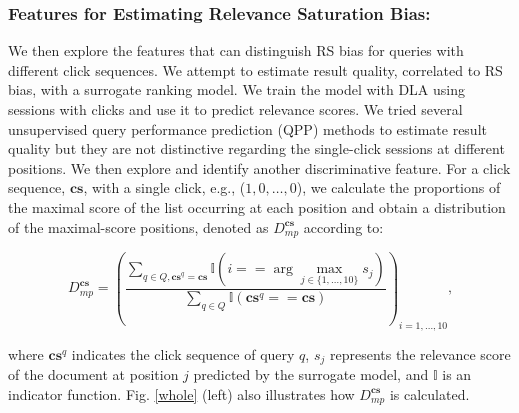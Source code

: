 \subsubsection{Features for Estimating Relevance Saturation Bias:} We then explore the features that can distinguish RS bias for queries with different click sequences. We attempt to estimate result quality, correlated to RS bias, with a surrogate ranking model. We train the model with DLA using sessions with clicks and use it to predict relevance scores. We tried several unsupervised query performance prediction (QPP) methods to estimate result quality but they are not distinctive regarding the single-click sessions at different positions. We then explore and identify another discriminative feature. For a click sequence, $\mathbf{cs}$, with a single click, e.g., ($1,0,\dots,0$), we calculate the proportions of the maximal score of the list occurring at each position and obtain a distribution of the maximal-score positions, denoted as $D_{mp}^{\mathbf{cs}}$ according to: 
\begin{small}
\begin{equation}
\label{dms}
    D_{mp}^{\mathbf{cs}}=(\frac{\sum_{q\in Q,\mathbf{cs}^q=\mathbf{cs}}\mathbb{I}(i ==\arg\max_{j \in \{1,\dots, 10\}} s_j)}{\sum_{q\in Q}\mathbb{I}(\mathbf{cs}^q==\mathbf{cs})})_{i=1,\dots,10}\text{,}
\end{equation}\end{small}where $\mathbf{cs}^q$ indicates the click sequence of query $q$, $s_j$ represents the relevance score of the document at position $j$ predicted by the surrogate model, and $\mathbb{I}$ is an indicator function. Fig. \ref{whole} (left) also illustrates how $D_{mp}^{\mathbf{cs}}$ is calculated. 


